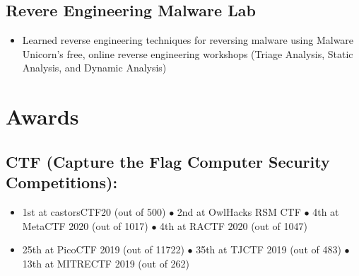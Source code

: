 \documentclass{article}
\begin{document}
\subsection{Revere Engineering Malware Lab}
\begin{itemize}
    \item Learned reverse engineering techniques for reversing malware using Malware Unicorn's free, online reverse engineering workshops (Triage Analysis, Static Analysis, and Dynamic Analysis)
\end{itemize}

\section{Awards}
\subsection{CTF (Capture the Flag Computer Security Competitions):}
\begin{itemize}
    \item 1st at castorsCTF20 (out of 500) $\bullet$ 2nd at OwlHacks RSM CTF $\bullet$ 4th at MetaCTF 2020 (out of 1017) $\bullet$ 4th at RACTF 2020 (out of 1047)
    \item 25th at PicoCTF 2019 (out of 11722) $\bullet$ 35th at TJCTF 2019 (out of 483) $\bullet$ 13th at MITRECTF 2019 (out of 262)
\end{itemize} 
\end{document}
